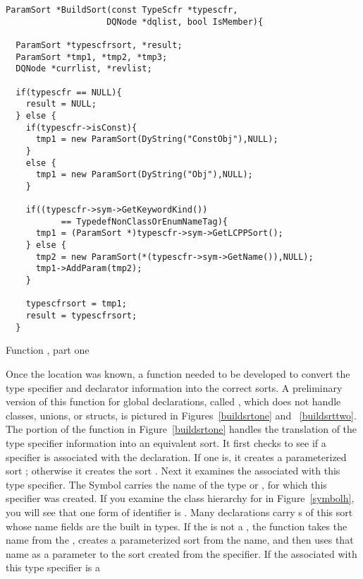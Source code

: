 \begin{BFIGURE}
\begin{verbatim}
ParamSort *BuildSort(const TypeScfr *typescfr, 
                    DQNode *dqlist, bool IsMember){

  ParamSort *typescfrsort, *result;
  ParamSort *tmp1, *tmp2, *tmp3;
  DQNode *currlist, *revlist;

  if(typescfr == NULL){
    result = NULL;
  } else {
    if(typescfr->isConst){
      tmp1 = new ParamSort(DyString("ConstObj"),NULL);
    }
    else {
      tmp1 = new ParamSort(DyString("Obj"),NULL);
    }
    
    if((typescfr->sym->GetKeywordKind()) 
           == TypedefNonClassOrEnumNameTag){
      tmp1 = (ParamSort *)typescfr->sym->GetLCPPSort();
    } else {
      tmp2 = new ParamSort(*(typescfr->sym->GetName()),NULL);
      tmp1->AddParam(tmp2);
    }

    typescfrsort = tmp1;
    result = typescfrsort;
  }
\end{verbatim}
\caption{Function , part one}
\label{buildsrtone}
\end{BFIGURE}
Once the location was known, a function needed to be developed to
convert the type specifier and declarator information into the correct
sorts. A preliminary version of this function for global declarations,
called , which does not handle classes,
unions, or structs, is pictured in Figures~\ref{buildsrtone} and
~\ref{buildsrttwo}. The portion of the function in
Figure~\ref{buildsrtone} handles the translation of the type specifier
information into an equivalent sort. It first checks to see if a
 specifier is associated with the declaration. If one
is, it creates a parameterized sort ; otherwise it
creates the sort . Next it examines the 
associated with this type specifier. The Symbol carries the name of
the type or , for which this specifier was
created. If you examine the class hierarchy for  in
Figure~\ref{symbolh}, you will see that one form of identifier is
. Many declarations carry s of this
sort whose name fields are the built in types. If the  is not a
, the function takes the name from the ,
creates a parameterized sort from the name, and then uses that name as
a parameter to the sort created from the 
specifier. If the  associated with this type specifier is a

